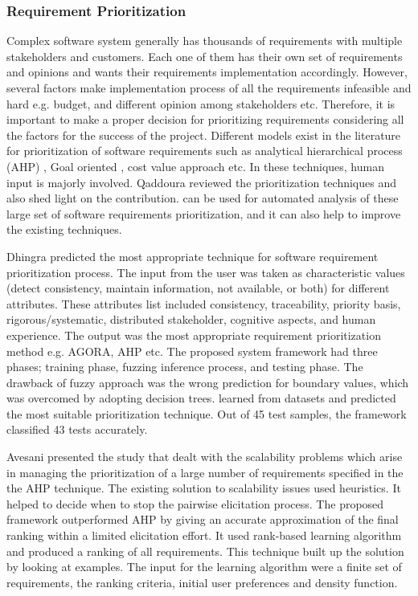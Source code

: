 \subsubsection{Requirement Prioritization}
Complex software system generally has thousands of requirements with multiple
stakeholders and customers. Each one of them has their own set of requirements
and opinions and wants their requirements implementation accordingly. However,
several factors make implementation process of all the requirements infeasible
and hard e.g. budget, and different opinion among
stakeholders etc. Therefore, it
is important to make a proper decision for prioritizing requirements considering
all the factors for the success of the project. Different models exist in the
literature for prioritization of software requirements such as analytical
hierarchical process (AHP) \cite{saaty2008}, Goal oriented
\cite{VanLamsweerde:2001}, cost value approach \cite{Karlsson:1997} etc. In these
techniques, human input is majorly involved. Qaddoura \etal \cite{R.Qaddoura}
reviewed the prioritization techniques and also shed light on the \ML
contribution. \ML can be used for automated analysis of these large set of
software requirements prioritization, and it can also help to improve the existing techniques.

	Dhingra \etal  \cite{S.Dhingra} predicted the most appropriate technique for
software requirement prioritization process. The input from the user was taken as characteristic values (detect consistency, maintain information, not available, or both) for different attributes. These attributes list included consistency,
traceability, priority basis, rigorous/systematic, distributed stakeholder,
cognitive aspects, and human experience. The output was the
most appropriate requirement prioritization method e.g. AGORA, AHP etc. The
proposed system framework had three phases; training phase, fuzzing inference
process, and testing phase. The drawback of fuzzy approach was the wrong prediction
for boundary values, which was overcomed by adopting decision trees. \DT learned from datasets and
predicted the most suitable prioritization technique. Out of 45 test samples, the
framework classified 43 tests accurately.

	Avesani \etal\cite{PAvesani} presented the study that dealt with the scalability
problems which arise in managing the prioritization of a large number of
requirements specified in the the AHP technique. The existing solution to
scalability issues used heuristics. It helped to decide when to stop the pairwise
elicitation process. The proposed framework outperformed AHP by giving an
accurate approximation of the final ranking within a limited elicitation effort. It used rank-based
learning algorithm and produced a ranking of all requirements. This technique
built up the solution by looking at examples. The input for the learning
algorithm were a finite set of requirements, the ranking criteria, initial user
preferences and density function.

